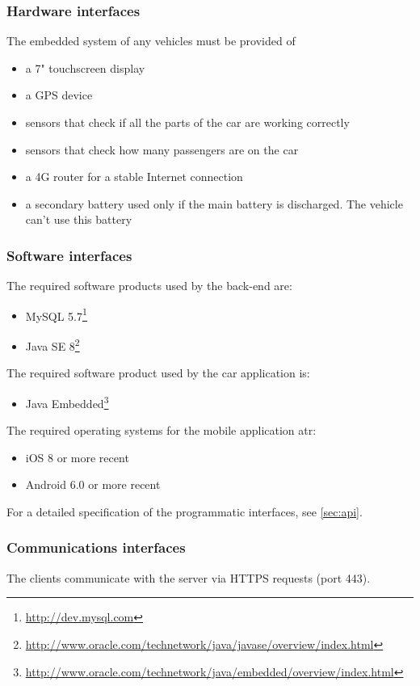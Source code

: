 \begin{itemize}
\subsubsection{Hardware interfaces}
The embedded system of any vehicles must be provided of	
\begin{itemize}
	\item a 7" touchscreen display
	\item a GPS device
	\item sensors that check if all the parts of the car are working correctly
	\item sensors that check how many passengers are on the car
	\item a 4G router for a stable Internet connection
	\item a secondary battery used only if the main battery is discharged. The vehicle can't use this battery
\end{itemize}

\subsubsection{Software interfaces}
The required software products used by the back-end are:
\begin{itemize}
	\item MySQL 5.7\footnote{\url{http://dev.mysql.com}}
	\item Java SE 8\footnote{\url{http://www.oracle.com/technetwork/java/javase/overview/index.html}}
\end{itemize}
The required software product used by the car application is:
\begin{itemize}
	\item Java Embedded\footnote{\url{http://www.oracle.com/technetwork/java/embedded/overview/index.html}}
\end{itemize}
The required operating systems for the mobile application atr:
\begin{itemize}
	\item iOS 8 or more recent
	\item Android 6.0 or more recent
\end{itemize}

For a detailed specification of the programmatic interfaces, see \autoref{sec:api}.
	
\subsubsection{Communications interfaces}
The clients communicate with the server via HTTPS requests (port 443).

\end{itemize}

